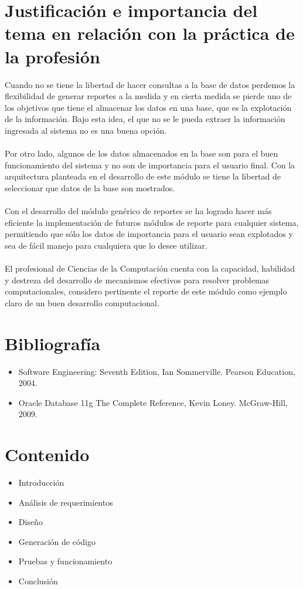 \documentclass{article}
\begin{document}
\section{Justificación e importancia del tema en relación con la práctica de la profesión}
Cuando no se tiene la libertad de hacer consultas a la base de datos perdemos la flexibilidad de generar reportes a la medida y en cierta medida se pierde uno de los objetivos que tiene el almacenar los datos en una base, que es la explotación de la información. Bajo esta idea, el que no se le pueda extraer la información ingresada al sistema no es una buena opción. \\ \\
Por otro lado, algunos de los datos almacenados en la base son para el buen funcionamiento del sistema y no son de importancia para el usuario final. Con la arquitectura planteada en el desarrollo de este módulo se tiene la libertad de seleccionar que datos de la base son mostrados.\\ \\
Con el desarrollo del módulo genérico de reportes se ha logrado hacer más eficiente la implementación de futuros módulos de reporte para cualquier sistema, permitiendo que sólo los datos de importancia para el usuario sean explotados y sea de fácil manejo para cualquiera que lo desee utilizar. \\ \\
El profesional de Ciencias de la Computación cuenta con la capacidad, habilidad y destreza del desarrollo de mecanismos efectivos para resolver problemas computacionales, considero pertinente el reporte de este módulo como ejemplo claro de un buen desarrollo computacional.


\section{Bibliografía}
\begin{itemize}
\item Software Engineering: Seventh Edition, Ian Sommerville. Pearson Education, 2004.
\item Oracle Database 11g The Complete Reference, Kevin Loney. McGraw-Hill, 2009. 
\end{itemize}


\section{Contenido}

\begin{itemize}
\item Introducción 
\item Análisis de requerimientos 
\item Diseño 
\item Generación de código
\item Pruebas y funcionamiento
\item Conclusión
\end{itemize}
\end{document}
